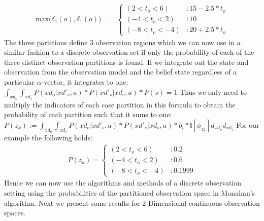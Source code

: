\documentclass{article} %
\begin{document}
{\footnotesize
\begin{align}
\mathrm{max} \Bigg(\delta_{1}(o),\delta_{1}(o)\Bigg) &= 
\begin{cases}
 (2<t_o<6) &: 15 - 2.5*t_o \\
(-4<t_o<2) &: 10 \\
(-8<t_o<-4) &: 20 + 2.5*t_o 
\end{cases}
\nonumber
\end{align}
}
The three partitions define 3 observation regions which we can now use in a similar fashion to a discrete observation set if only the probability of each of the three distinct observation partitions is found. If we integrate out the state and observation from the observation model and the belief state regardless of a particular $\alpha$-vector, it integrates to one: 
$\int_{xd_o}\int_{xd_s} P(xd_o|xd'_s,a)*P(xd'_s|xd_s,a)*P(s) = 1$
Thus we only need to multiply the indicators of each case partition in this formula to obtain the probability of each partition such that it sums to one: 
$P(z_k) := \int_{xd_o}\int_{xd_s} P(xd_o|xd'_s,a)*P(xd'_s|xd_s,a)*b_i* \mathbb{I}[\phi_{z_k}] d_{xd_o} d_{xd_s}$
For our example the following holds: 
{\footnotesize
\begin{align}
P(z_k)=
\begin{cases}
 (2<t_o<6) &: 0.2 \\
(-4<t_o<2) &: 0.6\\
(-8<t_o<-4) &:0.1999
\end{cases} 
\nonumber
\end{align}
}
Hence we can now use the algorithms and methods of a discrete observation setting using the probabilities of the partitioned observation space in Monahan's algorithm. 
Next we present some results for 2-Dimensional continuous observation spaces.

\end{document}
